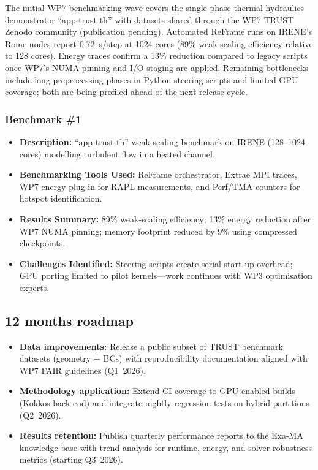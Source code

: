 The initial WP7 benchmarking wave covers the single-phase thermal-hydraulics demonstrator ``app-trust-th'' with datasets shared
through the WP7 TRUST Zenodo community (publication pending). Automated ReFrame runs on IRENE's Rome nodes report 0.72~s/step at 1024 cores (89\%
weak-scaling efficiency relative to 128 cores). Energy traces confirm a 13\% reduction compared to legacy scripts once WP7's
NUMA pinning and I/O staging are applied. Remaining bottlenecks include long preprocessing phases in Python steering scripts and
limited GPU coverage; both are being profiled ahead of the next release cycle.



\subsubsection{Benchmark \#1}
\begin{itemize}
    \item \textbf{Description:} ``app-trust-th'' weak-scaling benchmark on IRENE (128--1024 cores) modelling turbulent flow in a heated channel.
    \item \textbf{Benchmarking Tools Used:} ReFrame orchestrator, Extrae MPI traces, WP7 energy plug-in for RAPL measurements, and Perf/TMA counters for hotspot identification.
    \item \textbf{Results Summary:} 89\% weak-scaling efficiency; 13\% energy reduction after WP7 NUMA pinning; memory footprint reduced by 9\% using compressed checkpoints.
    \item \textbf{Challenges Identified:} Steering scripts create serial start-up overhead; GPU porting limited to pilot kernels---work continues with WP3 optimisation experts.
\end{itemize}

\subsection{12 months roadmap}
\label{sec:WP7:TRUST Platform:roadmap}

\begin{itemize}
    \item \textbf{Data improvements:} Release a public subset of TRUST benchmark datasets (geometry + BCs) with reproducibility documentation aligned with WP7 FAIR guidelines (Q1~2026).
    \item \textbf{Methodology application:} Extend CI coverage to GPU-enabled builds (Kokkos back-end) and integrate nightly regression tests on hybrid partitions (Q2~2026).
    \item \textbf{Results retention:} Publish quarterly performance reports to the Exa-MA knowledge base with trend analysis for runtime, energy, and solver robustness metrics (starting Q3~2026).
\end{itemize}

